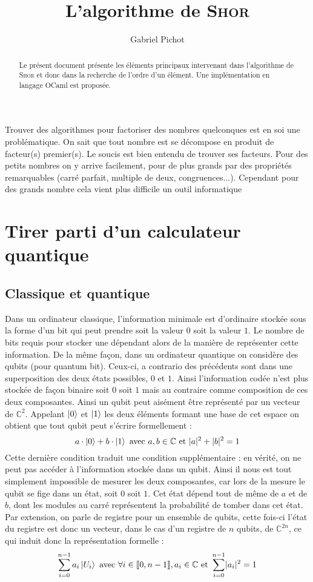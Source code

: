 \documentclass[a4paper,10pt]{article}
\title{L'algorithme de \textsc{Shor}}
\author{Gabriel Pichot}
\newcommand{\abs}[1]{\lvert #1 \rvert}
\newcommand{\C}{\ensuremath{\mathbb{C}}}
\newcommand{\intEntier}[1]{\ensuremath{\llbracket #1 \rrbracket}}
\begin{document}
\maketitle

\begin{abstract}
Le présent document présente les éléments principaux intervenant dans
l'algorithme de \textsc{Shor} et donc dans la recherche de l'ordre d'un élément.
Une implémentation en langage OCaml est proposée.
\end{abstract}

\newpage
Trouver des algorithmes pour factoriser des nombres quelconques est en soi une
problématique. On sait que tout nombre est se décompose en produit de facteur(s)
premier(s). Le soucis est bien entendu de trouver ses facteurs. Pour des petits
nombres on y arrive facilement, pour de plus grands par des propriétés
remarquables (carré parfait, multiple de deux, congruences...). Cependant pour
des grands nombre cela vient plus difficile un outil informatique

\section{Tirer parti d'un calculateur quantique}
\subsection{Classique et quantique}
Dans un ordinateur classique, l'information minimale est d'ordinaire stockée
sous la forme d'un bit qui peut prendre soit la valeur $0$ soit la valeur $1$.
Le nombre de bits requis pour stocker une dépendant alors de la manière de
représenter cette information. 
De la même façon, dans un ordinateur quantique on considère des qubits (pour
quantum bit). Ceux-ci, a contrario des précédents sont dans une superposition
des deux états possibles, $0$ et $1$. Ainsi l'information codée n'est plus
stockée de façon binaire soit $0$ soit $1$ mais au contraire comme composition
de ces deux composantes. Ainsi un qubit peut aisément être représenté par un
vecteur de $\C^2$. Appelant $\ket 0$ et $\ket 1$ les deux éléments formant une
base de cet espace on obtient que tout qubit peut s'écrire formellement :
\[ a \cdot \ket 0 + b \cdot \ket 1 \text{ avec } a,b\in\C \text{ et } \abs a
^2 + \abs b ^2 = 1 \]
Cette dernière condition traduit une condition supplémentaire : en vérité, on
ne peut pas accéder à l'information stockée dans un qubit. Ainsi il nous est
tout simplement impossible de mesurer les deux composantes, car lors de la
mesure le qubit se \og fige \fg{} dans un état, soit $0$ soit $1$. Cet état
dépend tout de même de $a$ et de $b$, dont les modules au carré représentent la
probabilité de tomber dans cet état.
Par extension, on parle de registre pour un ensemble de qubits, cette fois-ci
l'état du registre est donc un vecteur, dans le cas d'un registre de $n$
qubits, de $\C^{2n}$, ce qui induit donc la représentation formelle :
\[ \sum_{i=0}^{n-1} a_i \ket {U_i} \text{ avec } \forall i \in
\intEntier{0,n-1} , a_i \in\C \text{ et } \sum_{i=0}^{n-1} \abs{a_i} ^2 =
1 \]
\end{document}

